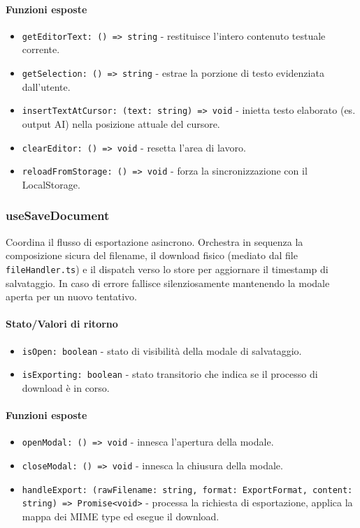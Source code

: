 \documentclass[11pt,a4paper]{article}
\begin{document}
\paragraph{Funzioni esposte}
\begin{itemize}
    \item \texttt{getEditorText: () => string} - restituisce l'intero contenuto testuale corrente.
    \item \texttt{getSelection: () => string} - estrae la porzione di testo evidenziata dall'utente.
    \item \texttt{insertTextAtCursor: (text: string) => void} - inietta testo elaborato (es. output AI) nella posizione attuale del cursore.
    \item \texttt{clearEditor: () => void} - resetta l'area di lavoro.
    \item \texttt{reloadFromStorage: () => void} - forza la sincronizzazione con il LocalStorage.
\end{itemize}


\subsubsection{useSaveDocument}
Coordina il flusso di esportazione asincrono. Orchestra in sequenza la composizione sicura del filename, il download fisico (mediato dal file \texttt{fileHandler.ts}) e il dispatch verso lo store per aggiornare il timestamp di salvataggio. In caso di errore fallisce silenziosamente mantenendo la modale aperta per un nuovo tentativo.


\paragraph{Stato/Valori di ritorno}
\begin{itemize}
    \item \texttt{isOpen: boolean} - stato di visibilità della modale di salvataggio.
    \item \texttt{isExporting: boolean} - stato transitorio che indica se il processo di download è in corso.
\end{itemize}

\paragraph{Funzioni esposte}
\begin{itemize}
    \item \texttt{openModal: () => void} - innesca l'apertura della modale.
    \item \texttt{closeModal: () => void} - innesca la chiusura della modale.
    \item \texttt{handleExport: (rawFilename: string, format: ExportFormat, content: string) => Promise<void>} - processa la richiesta di esportazione, applica la mappa dei MIME type ed esegue il download.
\end{itemize}
\end{document}
